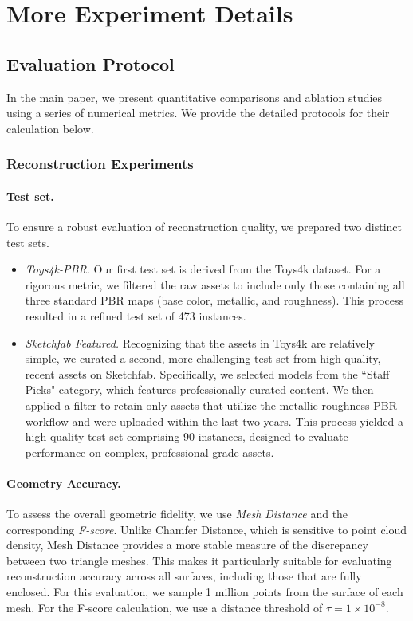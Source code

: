 \documentclass[10pt,twocolumn,letterpaper]{article}
\newcommand{\paravspace}{\vspace{-11pt}}
\begin{document}
\section{More Experiment Details}

\subsection{Evaluation Protocol}
In the main paper, we present quantitative comparisons and ablation studies using a series of numerical metrics. We provide the detailed protocols for their calculation below.

\subsubsection{Reconstruction Experiments}

\paragraph{Test set.}
To ensure a robust evaluation of reconstruction quality, we prepared two distinct test sets.
\begin{itemize}
    \item \textit{Toys4k-PBR.} Our first test set is derived from the Toys4k dataset. For a rigorous metric, we filtered the raw assets to include only those containing all three standard PBR maps (base color, metallic, and roughness). This process resulted in a refined test set of 473 instances.
    \item \textit{Sketchfab Featured.} Recognizing that the assets in Toys4k are relatively simple, we curated a second, more challenging test set from high-quality, recent assets on Sketchfab. Specifically, we selected models from the ``Staff Picks" category, which features professionally curated content. We then applied a filter to retain only assets that utilize the metallic-roughness PBR workflow and were uploaded within the last two years. This process yielded a high-quality test set comprising 90 instances, designed to evaluate performance on complex, professional-grade assets.
\end{itemize}

\paravspace
\paragraph{Geometry Accuracy.}
To assess the overall geometric fidelity, we use \emph{Mesh Distance} and the corresponding \emph{F-score}. Unlike Chamfer Distance, which is sensitive to point cloud density, Mesh Distance provides a more stable measure of the discrepancy between two triangle meshes. This makes it particularly suitable for evaluating reconstruction accuracy across all surfaces, including those that are fully enclosed. For this evaluation, we sample 1 million points from the surface of each mesh. For the F-score calculation, we use a distance threshold of $\tau = 1 \times 10^{-8}$.
\end{document}
